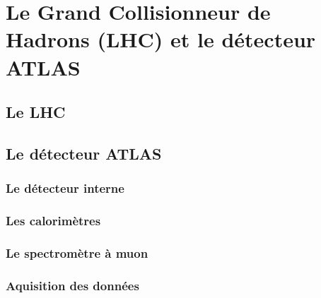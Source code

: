 \singlespacing{}
\chapter{Le Grand Collisionneur de Hadrons (LHC) et le détecteur
  ATLAS}
\label{sec:lhc_atlas}
\doublespacing{}

\section{Le LHC}
\label{sec:lhc_atlas:lhc}

\section{Le détecteur ATLAS}
\label{sec:lhc_atlas:atlas}

\subsection{Le détecteur interne}
\label{sec:lhc_atlas:atlas:indet}

\subsection{Les calorimètres}
\label{sec:lhc_atlas:atlas:calo}

\subsection{Le spectromètre à muon}
\label{sec:lhc_atlas:atlas:mu}

\subsection{Aquisition des données}
\label{sec:lhc_atlas:atlas:daq}
